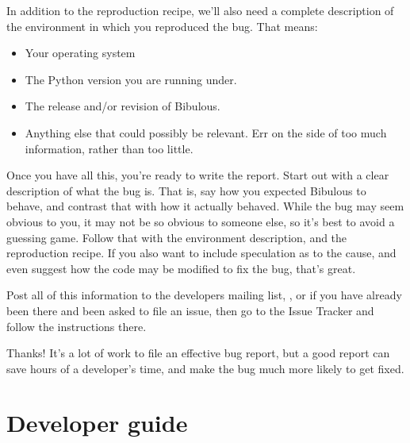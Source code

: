 \documentclass[letterpaper,10pt,english]{sphinxmanual}
\begin{document}
In addition to the reproduction recipe, we'll also need a complete description of the environment in which you reproduced the bug. That means:
\begin{itemize}
\item {} 
Your operating system

\item {} 
The Python version you are running under.

\item {} 
The release and/or revision of Bibulous.

\item {} 
Anything else that could possibly be relevant. Err on the side of too much information, rather than too little.

\end{itemize}

Once you have all this, you're ready to write the report. Start out with a clear description of what the bug is. That is, say how you expected Bibulous to behave, and contrast that with how it actually behaved. While the bug may seem obvious to you, it may not be so obvious to someone else, so it's best to avoid a guessing game. Follow that with the environment description, and the reproduction recipe. If you also want to include speculation as to the cause, and even suggest how the code may be modified to fix the bug, that's great.

Post all of this information to the developers mailing list, , or if you have already been there and been asked to file an issue, then go to the Issue Tracker and follow the instructions there.

Thanks! It's a lot of work to file an effective bug report, but a good report can save hours of a developer's time, and make the bug much more likely to get fixed.


\chapter{Developer guide}
\label{developer_guide::doc}\label{developer_guide:developer-guide}
\end{document}
